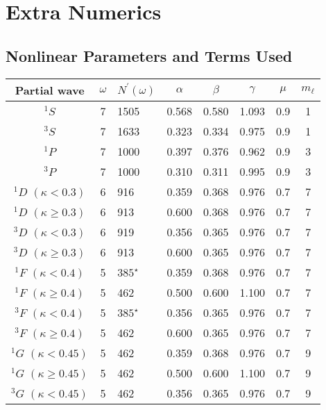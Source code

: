 \documentclass[Dissertation.tex]{subfiles}
\begin{document}
\chapter{Extra Numerics}
\label{chp:ExtraNumerics}

\section{Nonlinear Parameters and Terms Used}
\label{sec:NonlinParam}

\begin{table}[H]
  \centering
  \begin{tabular}{cclccccc}
	\toprule
	Partial wave & $\omega$ & $N^\prime(\omega)$ & $\alpha$ & $\beta$ & $\gamma$ & $\mu$ & $m_\ell$ \\
	\midrule
	$^1S$                      & 7 & 1505        & 0.568 & 0.580 & 1.093 & 0.9 & 1 \\
	$^3S$                      & 7 & 1633        & 0.323 & 0.334 & 0.975 & 0.9 & 1 \\
	$^1P$                      & 7 & 1000        & 0.397 & 0.376 & 0.962 & 0.9 & 3 \\
	$^3P$                      & 7 & 1000        & 0.310 & 0.311 & 0.995 & 0.9 & 3 \\
	$^1D$ $(\kappa < 0.3)$     & 6 & 916         & 0.359 & 0.368 & 0.976 & 0.7 & 7 \\
	$^1D$ $(\kappa \geq 0.3)$  & 6 & 913         & 0.600 & 0.368 & 0.976 & 0.7 & 7 \\
	$^3D$ $(\kappa < 0.3)$     & 6 & 919         & 0.356 & 0.365 & 0.976 & 0.7 & 7 \\
	$^3D$ $(\kappa \geq 0.3)$  & 6 & 913         & 0.600 & 0.365 & 0.976 & 0.7 & 7 \\
	$^1F$ $(\kappa < 0.4)$     & 5 & $385^\star$ & 0.359 & 0.368 & 0.976 & 0.7 & 7 \\
	$^1F$ $(\kappa \geq 0.4)$  & 5 & 462         & 0.500 & 0.600 & 1.100 & 0.7 & 7 \\
	$^3F$ $(\kappa < 0.4)$     & 5 & $385^\star$ & 0.356 & 0.365 & 0.976 & 0.7 & 7 \\
    $^3F$ $(\kappa \geq 0.4)$  & 5 & 462         & 0.600 & 0.365 & 0.976 & 0.7 & 7 \\
	$^1G$ $(\kappa < 0.45)$    & 5 & 462         & 0.359 & 0.368 & 0.976 & 0.7 & 9 \\
    $^1G$ $(\kappa \geq 0.45)$ & 5 & 462         & 0.500 & 0.600 & 1.100 & 0.7 & 9 \\
	$^3G$ $(\kappa < 0.45)$    & 5 & 462         & 0.356 & 0.365 & 0.976 & 0.7 & 9 \\

\end{tabular}
\end{table}
\end{document}

